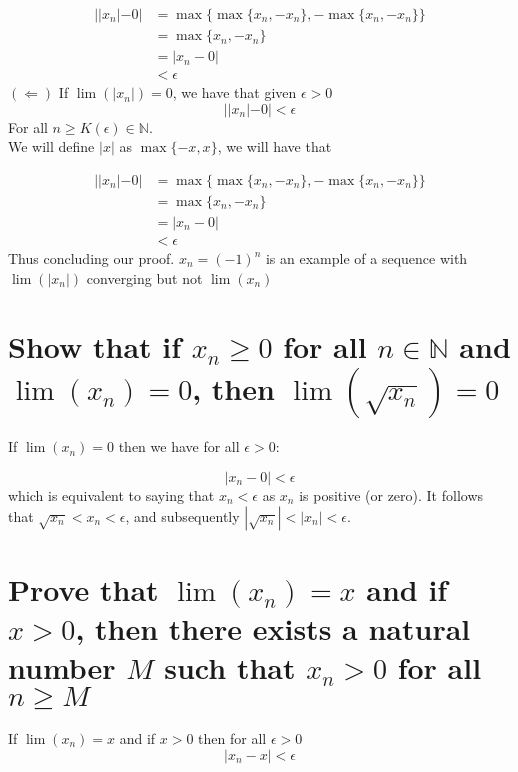 \documentclass{article}
\begin{document}
\begin{align*}
    ||x_n| - 0| & = \max\{\max\{x_n, -x_n\}, -\max\{x_n, -x_n\}\} \\
                & = \max\{x_n, -x_n\} \\
                & = |x_n - 0| \\
                & < \epsilon
\end{align*} 
$(\Longleftarrow)$  If $\lim(|x_n|) = 0$, we have that given $\epsilon > 0$ 
\begin{equation*}
    ||x_n| - 0| < \epsilon 
\end{equation*}
For all $n \ge K(\epsilon) \in \mathbb{N}$.
\\
We will define $|x|$ as $\max\{-x, x\}$, we will have that

\begin{align*}
    ||x_n| - 0| & = \max\{\max\{x_n, -x_n\}, -\max\{x_n, -x_n\}\} \\
                & = \max\{x_n, -x_n\} \\
                & = |x_n - 0| \\
                & < \epsilon
\end{align*} 
Thus concluding our proof. $x_n = (-1)^n$ is an example of a sequence with $\lim(|x_n|)$ converging but not $\lim(x_n)$

\section{Show that if $x_n \ge 0$ for all $n \in \mathbb{N}$ and $\lim(x_n) = 0$, then $\lim(\sqrt{x_n}) = 0$}
If $\lim(x_n) = 0$ then we have for all $\epsilon > 0$:

\begin{equation*}
    |x_n - 0| < \epsilon
\end{equation*}
which is equivalent to saying that $x_n < \epsilon$ as $x_n$ is positive (or zero).
It follows that $\sqrt{x_n} < x_n < \epsilon$, and subsequently $|\sqrt{x_n}| < |x_n| < \epsilon$.

\section{Prove that $\lim(x_n) = x$ and if $x > 0$, then there exists a natural number $M$ such that $x_n > 0$ for all $n \ge M$}

If $\lim(x_n) = x$ and if $x > 0$ then for all $\epsilon > 0$
\begin{equation*}
    |x_n - x| < \epsilon 
\end{equation*}

 
\end{document}
